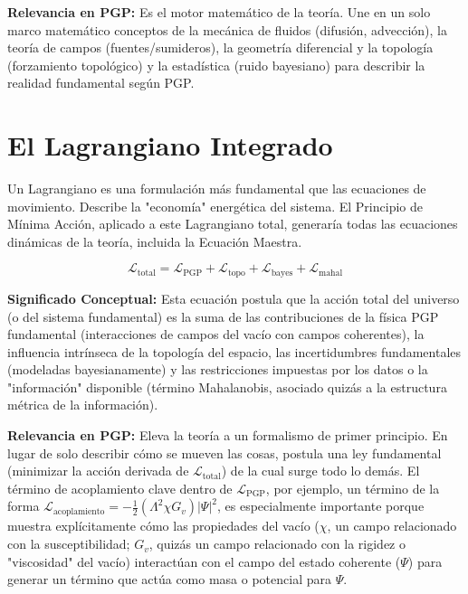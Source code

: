 \documentclass{article}
\begin{document}
\textbf{Relevancia en PGP:} Es el motor matemático de la teoría. Une en un solo marco matemático conceptos de la mecánica de fluidos (difusión, advección), la teoría de campos (fuentes/sumideros), la geometría diferencial y la topología (forzamiento topológico) y la estadística (ruido bayesiano) para describir la realidad fundamental según PGP.

\section{El Lagrangiano Integrado}

Un Lagrangiano es una formulación más fundamental que las ecuaciones de movimiento. Describe la "economía" energética del sistema. El Principio de Mínima Acción, aplicado a este Lagrangiano total, generaría todas las ecuaciones dinámicas de la teoría, incluida la Ecuación Maestra.

\begin{equation*}
\mathcal{L}_{\text{total}} = \mathcal{L}_{\text{PGP}} + \mathcal{L}_{\text{topo}} + \mathcal{L}_{\text{bayes}} + \mathcal{L}_{\text{mahal}}
\end{equation*}

\textbf{Significado Conceptual:} Esta ecuación postula que la acción total del universo (o del sistema fundamental) es la suma de las contribuciones de la física PGP fundamental (interacciones de campos del vacío con campos coherentes), la influencia intrínseca de la topología del espacio, las incertidumbres fundamentales (modeladas bayesianamente) y las restricciones impuestas por los datos o la "información" disponible (término Mahalanobis, asociado quizás a la estructura métrica de la información).

\textbf{Relevancia en PGP:} Eleva la teoría a un formalismo de primer principio. En lugar de solo describir cómo se mueven las cosas, postula una ley fundamental (minimizar la acción derivada de $\mathcal{L}_{\text{total}}$) de la cual surge todo lo demás. El término de acoplamiento clave dentro de $\mathcal{L}_{\text{PGP}}$, por ejemplo, un término de la forma $\mathcal{L}_{\text{acoplamiento}} = -\frac{1}{2}(\Lambda^2\chi G_v)\left|\Psi\right|^2$, es especialmente importante porque muestra explícitamente cómo las propiedades del vacío ($\chi$, un campo relacionado con la susceptibilidad; $G_v$, quizás un campo relacionado con la rigidez o "viscosidad" del vacío) interactúan con el campo del estado coherente ($\Psi$) para generar un término que actúa como masa o potencial para $\Psi$.
\end{document}
